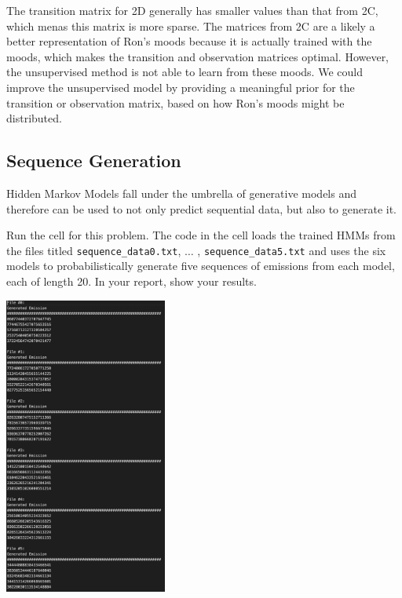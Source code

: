 \begin{solution}
  The transition matrix for 2D generally has smaller values than that from 2C, which menas this matrix is more sparse. The matrices from 2C are a likely a better representation of Ron's moods because it is actually trained with the moods, which makes the transition and observation matrices optimal. However, the unsupervised method is not able to learn from these moods. We could improve the unsupervised model by providing a meaningful prior for the transition or observation matrix, based on how Ron's moods might be distributed.
\end{solution}

\subsection{Sequence Generation}
Hidden Markov Models fall under the umbrella of generative models and therefore can be used to not only predict sequential data, but also to generate it.

\problem[5] Run the cell for this problem. The code in the cell loads the trained HMMs from the files titled \texttt{sequence_data0.txt}, $\ldots$ , \texttt{sequence_data5.txt} and uses the six models to probabilistically generate five sequences of emissions from each model, each of length 20. In your report, show your results. 

\begin{solution}
  \begin{center}
    \includegraphics[width=0.40\textwidth]{prob2f.png}
  \end{center}
\end{solution}

